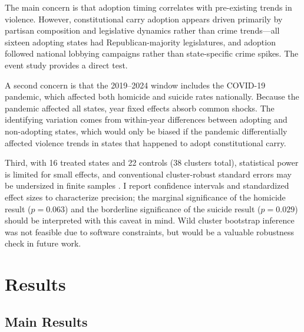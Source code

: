 \documentclass[12pt]{article}
\begin{document}
The main concern is that adoption timing correlates with pre-existing trends in violence. However, constitutional carry adoption appears driven primarily by partisan composition and legislative dynamics rather than crime trends---all sixteen adopting states had Republican-majority legislatures, and adoption followed national lobbying campaigns rather than state-specific crime spikes. The event study provides a direct test.

A second concern is that the 2019--2024 window includes the COVID-19 pandemic, which affected both homicide and suicide rates nationally. Because the pandemic affected all states, year fixed effects absorb common shocks. The identifying variation comes from within-year differences between adopting and non-adopting states, which would only be biased if the pandemic differentially affected violence trends in states that happened to adopt constitutional carry.

Third, with 16 treated states and 22 controls (38 clusters total), statistical power is limited for small effects, and conventional cluster-robust standard errors may be undersized in finite samples \citep{roth2023}. I report confidence intervals and standardized effect sizes to characterize precision; the marginal significance of the homicide result ($p = 0.063$) and the borderline significance of the suicide result ($p = 0.029$) should be interpreted with this caveat in mind. Wild cluster bootstrap inference was not feasible due to software constraints, but would be a valuable robustness check in future work.

\section{Results}
\label{sec:results}

\subsection{Main Results}
\end{document}
